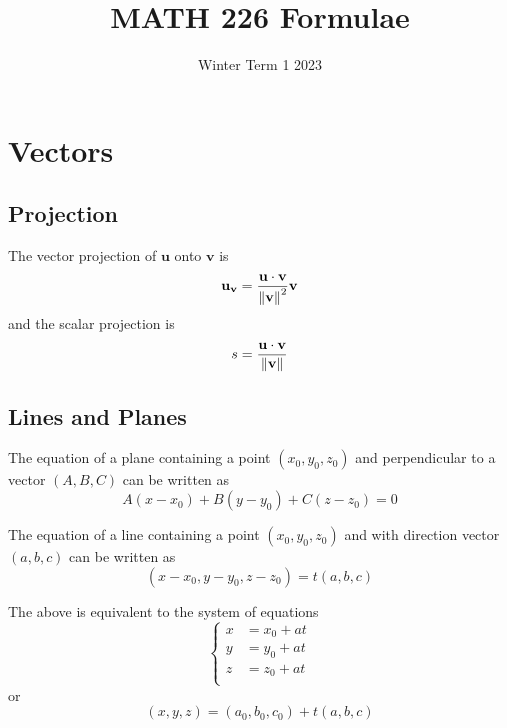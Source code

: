 \documentclass{article}
\begin{document}
\title{MATH 226 Formulae}
\date{Winter Term 1 2023}
\maketitle

\begin{tcolorbox}[title=, fonttitle=\huge\sffamily\bfseries\selectfont,interior style={left color=contcol1!40!white,right color=contcol2!40!white},frame style={left color=contcol1!80!white,right color=contcol2!80!white},coltitle=black,top=2mm,bottom=2mm,left=2mm,right=2mm,drop fuzzy shadow,enhanced,breakable]
  \tableofcontents
\end{tcolorbox}

\newpage
\section{Vectors}
\subsection{Projection}
\begin{definition}
  The vector projection of $\textbf{u}$ onto $\textbf{v}$ is
  \[
    \textbf{u}_\textbf{v} = \frac{\textbf{u} \cdot \textbf{v}}{\norm{\textbf{v}}^2}\textbf{v}
  \] and the scalar projection is \[
    s = \frac{\textbf{u} \cdot \textbf{v}}{\norm{\textbf{v}}}
  \]
\end{definition}
\subsection{Lines and Planes}
\begin{proposition}
  The equation of a plane containing a point $(x_0, y_0, z_0)$ and perpendicular to a vector $(A, B, C)$ can be written as \[
    A(x-x_0) + B(y-y_0) + C(z-z_0) = 0
  \]
\end{proposition}
\begin{proposition}
  The equation of a line containing a point $(x_0, y_0, z_0)$ and with direction vector $(a, b, c)$ can be written as \[
    (x - x_0, y-y_0, z-z_0) = t(a, b, c)
  \]
\end{proposition}
\begin{corollary}
  The above is equivalent to the system of equations \[
    \begin{cases}
      x &= x_0 + at\\
      y &= y_0 + at\\
      z &= z_0 + at\\
    \end{cases}
  \] or
  \[
    (x, y, z) = (a_0, b_0, c_0) + t(a, b, c)
  \]
\end{corollary}
\end{document}
